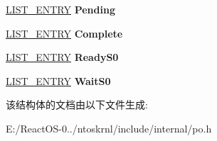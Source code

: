 \begin{DoxyCompactItemize}
\hyperlink{struct___l_i_s_t___e_n_t_r_y}{L\+I\+S\+T\+\_\+\+E\+N\+T\+RY} {\bfseries Pending}
\item 
\mbox{\label{struct___p_o___n_o_t_i_f_y___o_r_d_e_r___l_e_v_e_l_acad1cfcef724d098c7f4d5aa4ffd166b}} 
\hyperlink{struct___l_i_s_t___e_n_t_r_y}{L\+I\+S\+T\+\_\+\+E\+N\+T\+RY} {\bfseries Complete}
\item 
\mbox{\label{struct___p_o___n_o_t_i_f_y___o_r_d_e_r___l_e_v_e_l_aa40a5c9d3c96c8d0844497bef80dd09c}} 
\hyperlink{struct___l_i_s_t___e_n_t_r_y}{L\+I\+S\+T\+\_\+\+E\+N\+T\+RY} {\bfseries Ready\+S0}
\item 
\mbox{\label{struct___p_o___n_o_t_i_f_y___o_r_d_e_r___l_e_v_e_l_ad8fe0087d2b02efa653e31cfac5b4145}} 
\hyperlink{struct___l_i_s_t___e_n_t_r_y}{L\+I\+S\+T\+\_\+\+E\+N\+T\+RY} {\bfseries Wait\+S0}
\end{DoxyCompactItemize}


该结构体的文档由以下文件生成\+:\begin{DoxyCompactItemize}
\item 
E\+:/\+React\+O\+S-\/0../ntoskrnl/include/internal/po.\+h\end{DoxyCompactItemize}
